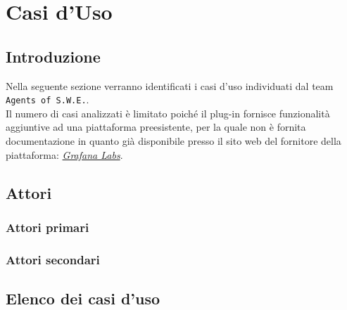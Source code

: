 \section{Casi d'Uso}\label{CasiUso}
\subsection{Introduzione}\label{CasiUso_Introduzione}
Nella seguente sezione verranno identificati i casi d'uso individuati dal team \texttt{Agents of S.W.E.}.\\
Il numero di casi analizzati è limitato poiché il plug-in fornisce funzionalità aggiuntive ad una piattaforma preesistente, per la quale non è fornita documentazione in quanto già disponibile presso il sito web del fornitore della piattaforma: \href{http://docs.grafana.org/}{\textit{Grafana Labs}}.\\

\subsection{Attori}
\subsubsection{Attori primari}


\subsubsection{Attori secondari}

\subsection{Elenco dei casi d'uso}


